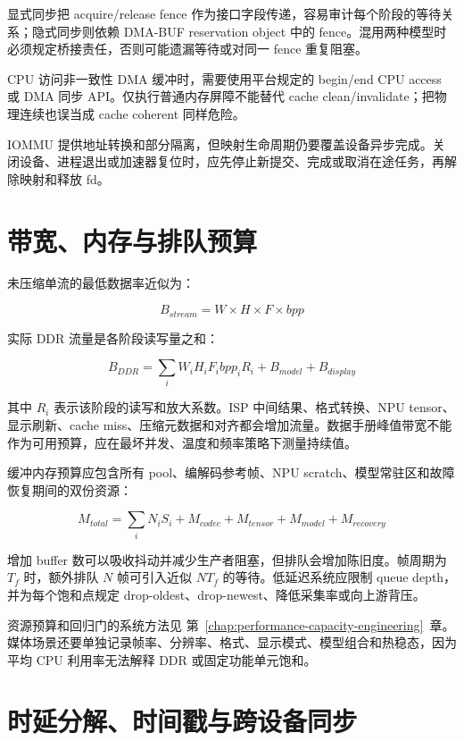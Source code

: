 显式同步把 acquire/release fence 作为接口字段传递，容易审计每个阶段的等待关系；隐式同步则依赖 DMA-BUF reservation object 中的 fence。混用两种模型时必须规定桥接责任，否则可能遗漏等待或对同一 fence 重复阻塞。

CPU 访问非一致性 DMA 缓冲时，需要使用平台规定的 begin/end CPU access 或 DMA 同步 API。仅执行普通内存屏障不能替代 cache clean/invalidate；把物理连续也误当成 cache coherent 同样危险。

IOMMU 提供地址转换和部分隔离，但映射生命周期仍要覆盖设备异步完成。关闭设备、进程退出或加速器复位时，应先停止新提交、完成或取消在途任务，再解除映射和释放 fd。

\section{带宽、内存与排队预算}

未压缩单流的最低数据率近似为：

\begin{equation}
  B_{stream}=W\times H\times F\times bpp
\end{equation}

实际 DDR 流量是各阶段读写量之和：

\begin{equation}
  B_{DDR}=\sum_i W_i H_i F_i bpp_i R_i + B_{model}+B_{display}
\end{equation}

其中 $R_i$ 表示该阶段的读写和放大系数。ISP 中间结果、格式转换、NPU tensor、显示刷新、cache miss、压缩元数据和对齐都会增加流量。数据手册峰值带宽不能作为可用预算，应在最坏并发、温度和频率策略下测量持续值。

缓冲内存预算应包含所有 pool、编解码参考帧、NPU scratch、模型常驻区和故障恢复期间的双份资源：

\begin{equation}
  M_{total}=\sum_i N_i S_i+M_{codec}+M_{tensor}+M_{model}+M_{recovery}
\end{equation}

增加 buffer 数可以吸收抖动并减少生产者阻塞，但排队会增加陈旧度。帧周期为 $T_f$ 时，额外排队 $N$ 帧可引入近似 $N T_f$ 的等待。低延迟系统应限制 queue depth，并为每个饱和点规定 drop-oldest、drop-newest、降低采集率或向上游背压。

资源预算和回归门的系统方法见 \mbox{第~\ref{chap:performance-capacity-engineering}~章}。媒体场景还要单独记录帧率、分辨率、格式、显示模式、模型组合和热稳态，因为平均 CPU 利用率无法解释 DDR 或固定功能单元饱和。

\section{时延分解、时间戳与跨设备同步}

